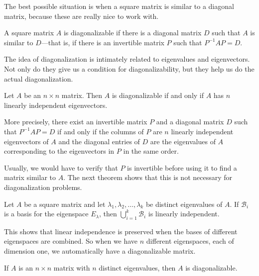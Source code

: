 \documentclass[../m073main.tex]{subfiles}
\begin{document}
The best possible situation is when a square matrix is similar to a diagonal matrix, because these are really nice to work with.

\begin{definition}
	A square matrix $A$ is diagonalizable if there is a diagonal matrix $D$ such that $A$ is similar to $D$---that is, if there is an invertible matrix $P$ such that $P^{-1}AP = D$.
\end{definition}

The idea of diagonalization is intimately related to eigenvalues and eigenvectors.
Not only do they give us a condition for diagonalizability, but they help us do the actual diagonalization.

\begin{theorem}
	Let $A$ be an $n \times n$ matrix.
	Then $A$ is diagonalizable if and only if $A$ has $n$ linearly independent eigenvectors.

	More precisely, there exist an invertible matrix $P$ and a diagonal matrix $D$ such that $P^{-1}AP = D$ if and only if the columns of $P$ are $n$ linearly independent eigenvectors of $A$ and the diagonal entries of $D$ are the eigenvalues of $A$ corresponding to the eigenvectors in $P$ in the same order.
\end{theorem}

Usually, we would have to verify that $P$ is invertible before using it to find a matrix similar to $A$.
The next theorem shows that this is not necessary for diagonalization problems.

\begin{theorem}
	Let $A$ be a square matrix and let $\lambda_1, \lambda_2, \ldots, \lambda_k$ be distinct eigenvalues of $A$.
	If $\mathcal{B}_i$ is a basis for the eigenspace $E_\lambda$, then $\displaystyle\bigcup_{i=1}^k\mathcal{B}_i$ is linearly independent.
\end{theorem}

This shows that linear independence is preserved when the bases of different eigenspaces are combined.
So when we have $n$ different eigenspaces, each of dimension one, we automatically have a diagonalizable matrix.

\begin{theorem}
	If $A$ is an $n \times n$ matrix with $n$ distinct eigenvalues, then $A$ is diagonalizable.
\end{theorem}
\end{document}
